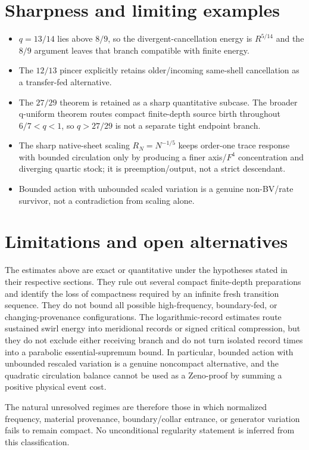 \documentclass[11pt]{article}
\theoremstyle{definition}\newtheorem{definition}[theorem]{Definition}
\theoremstyle{remark}\newtheorem{remark}[theorem]{Remark}
\begin{document}
\section{Sharpness and limiting examples}
\begin{itemize}[leftmargin=*]
\item $q=13/14$ lies above $8/9$, so the divergent-cancellation energy is
$R^{5/14}$ and the $8/9$ argument leaves that branch compatible with finite
energy.
\item The $12/13$ pincer explicitly retains older/incoming same-shell
cancellation as a transfer-fed alternative.
\item The $27/29$ theorem is retained as a sharp quantitative subcase.  The broader q-uniform theorem routes compact finite-depth source birth throughout $6/7<q<1$, so $q>27/29$ is not a separate tight endpoint branch.
\item The sharp native-sheet scaling $R_N=N^{-1/5}$ keeps order-one trace
response with bounded circulation only by producing a finer axis/$F^4$ concentration and
diverging quartic stock; it is preemption/output, not a strict descendant.
\item Bounded action with unbounded scaled variation is a genuine non-BV/rate
survivor, not a contradiction from scaling alone.
\end{itemize}

\section{Limitations and open alternatives}
The estimates above are exact or quantitative under the hypotheses stated in their respective sections.  They rule out several compact finite-depth preparations and identify the loss of compactness required by an infinite fresh transition sequence.  They do not bound all possible high-frequency, boundary-fed, or changing-provenance configurations.  The logarithmic-record estimates route sustained swirl energy into meridional records or signed critical compression, but they do not exclude either receiving branch and do not turn isolated record times into a parabolic essential-supremum bound.  In particular, bounded action with unbounded rescaled variation is a genuine noncompact alternative, and the quadratic circulation balance cannot be used as a Zeno-proof by summing a positive physical event cost.

The natural unresolved regimes are therefore those in which normalized frequency, material provenance, boundary/collar entrance, or generator variation fails to remain compact.  No unconditional regularity statement is inferred from this classification.
\end{document}
